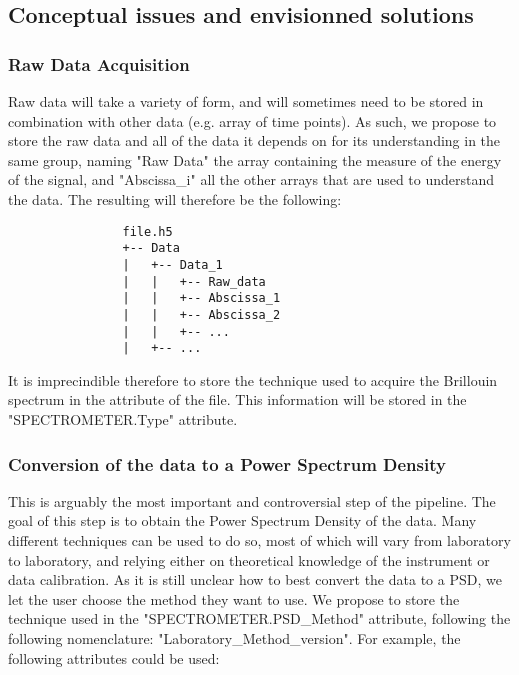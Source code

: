 \documentclass{article}
\begin{document}
    \subsection{Conceptual issues and envisionned solutions}
    
        \subsubsection{Raw Data Acquisition}
            Raw data will take a variety of form, and will sometimes need to be stored in combination with other data (e.g. array of time points). As such, we propose to store the raw data and all of the data it depends on for its understanding in the same group, naming "Raw Data" the array containing the measure of the energy of the signal, and "Abscissa\_i" all the other arrays that are used to understand the data. The resulting will therefore be the following:

            \begin{verbatim}
                file.h5
                +-- Data
                |   +-- Data_1
                |   |   +-- Raw_data
                |   |   +-- Abscissa_1
                |   |   +-- Abscissa_2
                |   |   +-- ...
                |   +-- ...
            \end{verbatim}

            It is imprecindible therefore to store the technique used to acquire the Brillouin spectrum in the attribute of the file. This information will be stored in the "SPECTROMETER.Type" attribute. 
    
        \subsubsection{Conversion of the data to a Power Spectrum Density}

            This is arguably the most important and controversial step of the pipeline. The goal of this step is to obtain the Power Spectrum Density of the data. Many different techniques can be used to do so, most of which will vary from laboratory to laboratory, and relying either on theoretical knowledge of the instrument or data calibration. As it is still unclear how to best convert the data to a PSD, we let the user choose the method they want to use. We propose to store the technique used in the "SPECTROMETER.PSD\_Method" attribute, following the following nomenclature: "Laboratory\_Method\_version". For example, the following attributes could be used:
\end{document}
